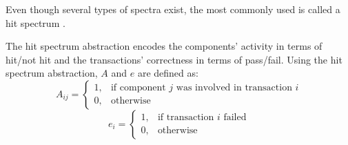 Even though several types of spectra exist, the most commonly used is
called a hit spectrum \citep{Harrold98,Yilmaz08,Santelices09}.
%
\begin{definition}
  \label{def:intro:hit-spectrum}
  The hit spectrum abstraction encodes the components' activity in terms
  of hit/not hit and the transactions' correctness in terms of
  pass/fail.
  Using the hit spectrum abstraction, $A$ and $e$ are defined as:
  \begin{equation}
    A_{ij} = \begin{cases}
      1, & \textrm{if component $j$ was involved in transaction $i$}\\
      0, & \textrm{otherwise}
    \end{cases}
  \end{equation}
  \begin{equation}
    e_{i} = \begin{cases}
      1, & \textrm{if transaction $i$ failed}\\
      0, & \textrm{otherwise}
    \end{cases}
  \end{equation}
\end{definition}


